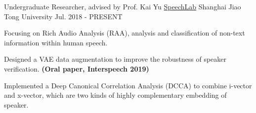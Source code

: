 \begin{cventries}

	\cventry
	{Undergraduate Researcher, advised by Prof. Kai Yu}
	{\href{https://speechlab.sjtu.edu.cn/}{SpeechLab}}
	{Shanghai Jiao Tong University}
	{Jul. 2018 - PRESENT}
	{
		\begin{cvitems}
			\item {Focusing on Rich Audio Analysis (RAA), analysis and classification of non-text information within human speech.}
            \item {Designed a VAE data augmentation to improve the robustness of speaker verification. \textbf{(Oral paper, Interspeech 2019)}}
            \item {Implemented a Deep Canonical Correlation Analysis (DCCA) to combine i-vector and x-vector, which are two kinds of highly complementary embedding of speaker.}
		\end{cvitems}
	}
	
\end{cventries}
